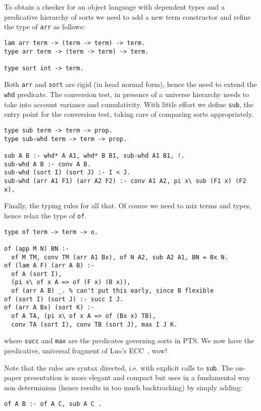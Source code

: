 \documentclass{easychair}
\begin{document}
To obtain a checker for an object language with dependent types and
a predicative hierarchy of sorts we need to add a new term constructor
and refine the type of \verb+arr+ as follows:

\begin{verbatim}
lam arr term -> (term -> term) -> term.
type arr term -> (term -> term) -> term.

type sort int -> term.
\end{verbatim}

Both \verb+arr+ and \verb+sort+ are rigid (in head normal form), hence the need to extend the \verb+whd+ predicate.  The conversion test, in presence of
a universe hierarchy needs to take into account variance and cumulativity.
With little effort we define \verb+sub+, the entry point for the conversion 
test, taking care of comparing sorts appropriately.

\begin{verbatim}
type sub term -> term -> prop.
type sub-whd term -> term -> prop.

sub A B :- whd* A A1, whd* B B1, sub-whd A1 B1, !.
sub-whd A B :- conv A B.
sub-whd (sort I) (sort J) :- I < J.
sub-whd (arr A1 F1) (arr A2 F2) :- conv A1 A2, pi x\ sub (F1 x) (F2 x).
\end{verbatim}

Finally, the typing rules for all that.  Of course we need to mix
terms and types, hence relax the type of \verb+of+.

\begin{verbatim}
type of term -> term -> o.

of (app M N) BN :-
  of M TM, conv TM (arr A1 Bx), of N A2, sub A2 A1, BN = Bx N.
of (lam A F) (arr A B) :-
  of A (sort I),
  (pi x\ of x A => of (F x) (B x)),
  of (arr A B) _. % can't put this early, since B flexible
of (sort I) (sort J) :- succ I J.
of (arr A Bx) (sort K) :-
  of A TA, (pi x\ of x A => of (Bx x) TB),
  conv TA (sort I), conv TB (sort J), max I J K.
\end{verbatim}

where \verb+succ+ and \verb+max+ are the predicates governing sorts in
PTS.  We now have the predicative, universal fragment of Luo's
ECC~\cite{luo}, wow!

Note that the rules are syntax directed, i.e. with explicit calls to
\verb+sub+.  The on-paper presentation is more elegant and compact but 
uses in a fundamental way non determinism (hence results in too much
backtracking) by simply adding:

\begin{verbatim}
of A B :- of A C, sub A C .
\end{verbatim}
\end{document}
